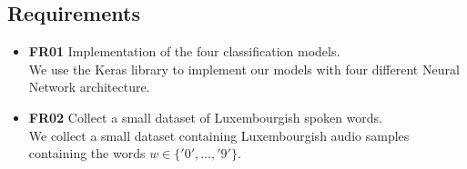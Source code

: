 
\subsection{Requirements}


\begin{itemize}
  \item \textbf{FR01} Implementation of the four classification models.\\
    We use the Keras library to implement our models with four different Neural
    Network architecture.
  \item \textbf{FR02} Collect a small dataset of Luxembourgish spoken words.\\
    We collect a small dataset containing Luxembourgish audio samples containing
    the words $w \in \{'0',\dots,'9'\}$.
\end{itemize}

